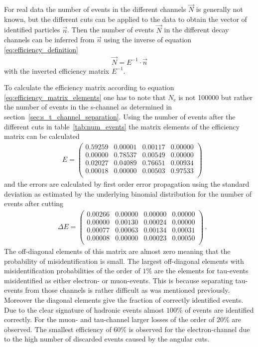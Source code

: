 \documentclass[11pt, a4paper]{article}
\numberwithin{equation}{section}
\begin{document}
For real data the number of events in the different channels $\vec{N}$ is generally not known, but the different cuts can be applied to the data to obtain the vector of identified particles $\vec{n}$.
Then the number of events $\vec{N}$ in the different decay channels can be inferred from $\vec{n}$ using the inverse of equation \eqref{eq:efficiency_definition}
\begin{align}
	\vec{N} = E^{-1} \cdot \vec{n}
	\label{eq:efficiency_correction}
\end{align}
with the inverted efficiency matrix $E^{-1}$.

To calculate the efficiency matrix according to equation \eqref{eq:efficiency_matrix_elements} one has to note that $N_\mathrm{e}$ is not \num{100000} but rather the number of events in the s-channel as determined in section~\ref{sec:s_t_channel_separation}.
Using the number of events after the different cuts in table~\ref{tab:num_events} the matrix elements of the efficiency matrix can be calculated
\begin{align*}
	&E = \begin{pmatrix}
	0.59259 & 0.00001 & 0.00117 & 0.00000 \\
	0.00000 & 0.78537 & 0.00549 & 0.00000 \\
	0.02027 & 0.04089 & 0.76651 & 0.00934 \\
	0.00018 & 0.00000 & 0.00503 & 0.97533 \\
	\end{pmatrix}
\end{align*}
and the errors are calculated by first order error propagation using the standard deviation as estimated by the underlying binomial distribution for the number of events after cutting
\begin{align*}
	&\Delta E = \begin{pmatrix}
	0.00266 & 0.00000 & 0.00000 & 0.00000 \\
	0.00000 & 0.00130 & 0.00024 & 0.00000 \\
	0.00077 & 0.00063 & 0.00134 & 0.00031 \\
	0.00008 & 0.00000 & 0.00023 & 0.00050 \\
	\end{pmatrix} \,\text{.}
\end{align*}
The off-diagonal elements of this matrix are almost zero meaning that the probability of misidentification is small.
The largest off-diagonal elements with misidentification probabilities of the order of $1 \%$ are the elements for tau-events misidentified as either electron- or muon-events.
This is because separating tau-events from those channels is rather difficult as was mentioned previously.
Moreover the diagonal elements give the fraction of correctly identified events.
Due to the clear signature of hadronic events almost $100 \%$ of events are identified correctly.
For the muon- and tau-channel larger losses of the order of $20 \%$ are observed.
The smallest efficiency of $60 \%$ is observed for the electron-channel due to the high number of discarded events caused by the angular cuts.
\end{document}
